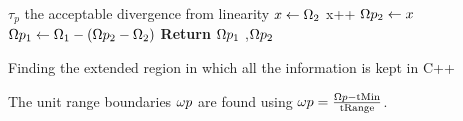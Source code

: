 \begin{algorithm}[H]
\begin{algorithmic}
 \linebreak \phantom{Require} $\tau_{p}$ the acceptable divergence from linearity 
 \State $x \gets \Omega_2$  
     \State  x++ 
 \EndWhile
 \State $\Omega p_2 \gets x$ 
 \State $\Omega p_1 \gets \Omega _1 - (\Omega p_2 - \Omega _2)$ 
 \State \textbf{Return} {$\Omega p_1$ ,$\Omega p_2$ }
 \end{algorithmic}
  \caption{Finding the extended region in which all the information is kept in C++}
\end{algorithm}

The unit range boundaries $\omega p$ are found using  $\omega p =  \frac{\Omega p - \text{tMin}}{\text{tRange}}$.


